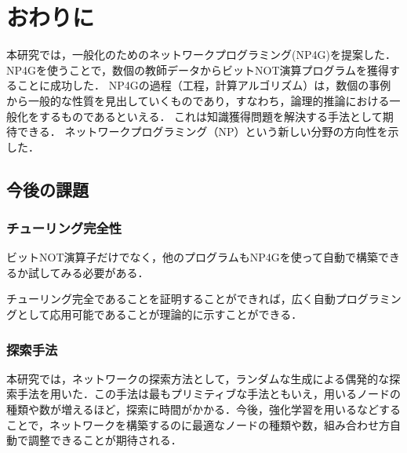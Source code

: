 \documentclass[exploratorypaper]{jsaiart} %
\begin{document}
\section{おわりに}
本研究では，一般化のためのネットワークプログラミング(NP4G)を提案した．NP4Gを使うことで，数個の教師データからビットNOT演算プログラムを獲得することに成功した．
NP4Gの過程（工程，計算アルゴリズム）は，数個の事例から一般的な性質を見出していくものであり，すなわち，論理的推論における一般化をするものであるといえる．
これは知識獲得問題を解決する手法として期待できる．
ネットワークプログラミング（NP）という新しい分野の方向性を示した．
\subsection{今後の課題}
\subsubsection{チューリング完全性}

ビットNOT演算子だけでなく，他のプログラムもNP4Gを使って自動で構築できるか試してみる必要がある．

チューリング完全であることを証明することができれば，広く自動プログラミングとして応用可能であることが理論的に示すことができる．
\subsubsection{探索手法}
本研究では，ネットワークの探索方法として，ランダムな生成による偶発的な探索手法を用いた．この手法は最もプリミティブな手法ともいえ，用いるノードの種類や数が増えるほど，探索に時間がかかる．今後，強化学習を用いるなどすることで，ネットワークを構築するのに最適なノードの種類や数，組み合わせ方自動で調整できることが期待される．





\begin{biography}
\end{biography}
\end{document}
